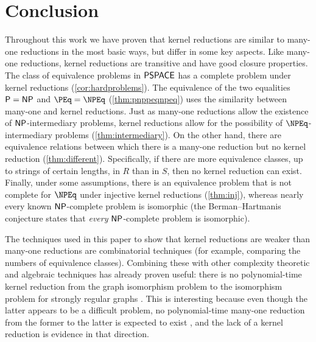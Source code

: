 \section{Conclusion}
%
Throughout this work we have proven that kernel reductions are similar to many-one reductions in the most basic ways, but differ in some key aspects.
Like many-one reductions, kernel reductions are transitive and have good closure properties.
The class of equivalence problems in ${\mathsf{PSPACE}}$ has a complete problem under kernel reductions (\autoref{cor:hardproblems}).
The equivalence of the two equalities ${\mathsf{P}} = {\mathsf{NP}}$ and $\PEq = \NPEq$ (\autoref{thm:pnppeqnpeq}) uses the similarity between many-one and kernel reductions.
Just as many-one reductions allow the existence of ${\mathsf{NP}}$-intermediary problems, kernel reductions allow for the possibility of $\NPEq$-intermediary problems (\autoref{thm:intermediary}).
On the other hand, there are equivalence relations between which there is a many-one reduction but no kernel reduction (\autoref{thm:different}).
Specifically, if there are more equivalence classes, up to strings of certain lengths, in $R$ than in $S$, then no kernel reduction can exist.
Finally, under some assumptions, there is an equivalence problem that is not complete for $\NPEq$ under injective kernel reductions (\autoref{thm:inj}), whereas nearly every known ${\mathsf{NP}}$-complete problem is isomorphic (the Berman--Hartmanis conjecture \autocite{bh77} states that \emph{every} ${\mathsf{NP}}$-complete problem is isomorphic).

The techniques used in this paper to show that kernel reductions are weaker than many-one reductions are combinatorial techniques (for example, comparing the numbers of equivalence classes).
Combining these with other complexity theoretic and algebraic techniques has already proven useful: there is no polynomial-time kernel reduction from the graph isomorphism problem to the isomorphism problem for strongly regular graphs \autocite[Theorem~22]{babai14}.
This is interesting because even though the latter appears to be a difficult problem, no polynomial-time many-one reduction from the former to the latter is expected to exist \autocite{babai14}, and the lack of a kernel reduction is evidence in that direction.

